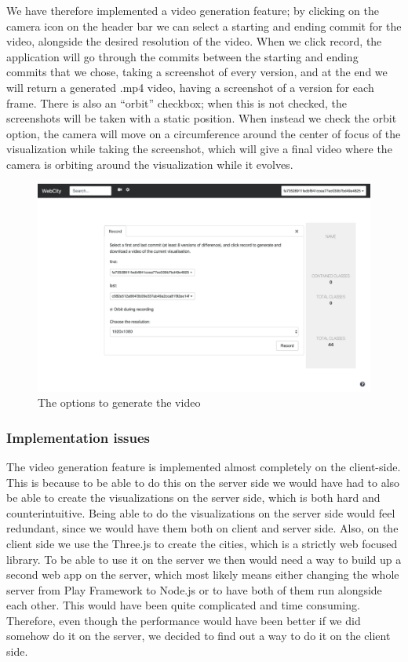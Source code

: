 \documentclass[]{usiinfbachelorproject}
\begin{document}
We have therefore implemented a video generation feature; by clicking on the camera icon on the header bar we can select a starting and ending commit for the video, alongside the desired resolution of the video. When we click record, the application will go through the commits between the starting and ending commits that we chose, taking a screenshot of every version, and at the end we will return a generated .mp4 video, having a screenshot of a version for each frame.
There is also an ``orbit'' checkbox; when this is not checked, the screenshots will be taken with a static position. When instead we check the orbit option, the camera will move on a circumference around the center of focus of the visualization while taking the screenshot, which will give a final video where the camera is orbiting around the visualization while it evolves.

\begin{figure} [H]
\centering
\includegraphics[width=1\textwidth]{pictures/record_card.png}
\caption{The options to generate the video}
\label{fig:record}
\end{figure}

\subsubsection{Implementation issues} \label{Implementation issues}

The video generation feature is implemented almost completely on the client-side. This is because to be able to do this on the server side we would have had to also be able to create the visualizations on the server side, which is both hard and counterintuitive. Being able to do the visualizations on the server side would feel redundant, since we would have them both on client and server side.
Also, on the client side we use the Three.js to create the cities, which is a strictly web focused library. To be able to use it on the server we then would need a way to build up a second web app on the server, which most likely means either changing the whole server from Play Framework to Node.js or to have both of them run alongside each other. This would have been quite complicated and time consuming.
Therefore, even though the performance would have been better if we did somehow do it on the server, we decided to find out a way to do it on the client side.
\end{document}

